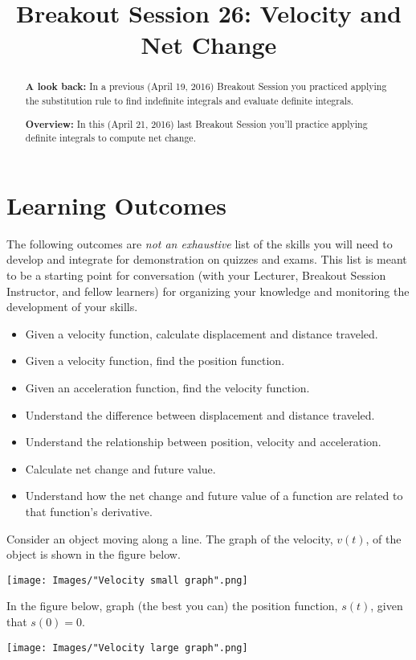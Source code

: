 \documentclass[handout, nooutcomes]{ximera}
\title{Breakout Session 26: Velocity and Net Change}
\begin{document}
\begin{abstract}
  \textbf{A look back:} In a previous (April 19, 2016) Breakout Session you practiced applying the substitution rule to find indefinite integrals and evaluate definite integrals.

  \textbf{Overview:} In this (April 21, 2016) last Breakout Session you'll practice applying definite integrals to compute net change.
\end{abstract}
\maketitle

\section{Learning Outcomes}
\label{section:learning-outcomes}
The following outcomes are \emph{not an exhaustive} list of the skills you will need to develop and integrate for demonstration on quizzes and exams.
This list is meant to be a starting point for conversation (with your Lecturer, Breakout Session Instructor, and fellow learners) for organizing your knowledge and monitoring the development of your skills.

\begin{itemize}
  \item
    Given a velocity function, calculate displacement and distance traveled.

  \item
    Given a velocity function, find the position function.

  \item
    Given an acceleration function, find the velocity function.

  \item
    Understand the difference between displacement and distance traveled.

  \item
    Understand the relationship between position, velocity and acceleration.

  \item
    Calculate net change and future value.

  \item
    Understand how the net change and future value of a function are related to that function’s derivative.
\end{itemize}
\newpage

\begin{problem}
  Consider an object moving along a line.
  The graph of the velocity, $v(t)$, of the object is shown in the figure below.
  \begin{image}
    \texttt{[image: Images/"Velocity small graph".png]}
  \end{image}

  In the figure below, graph (the best you can) the position function, $s(t)$, given that $s(0) = 0$.
  \begin{image}
    \texttt{[image: Images/"Velocity large graph".png]}
  \end{image}
\end{problem}
\end{document}
